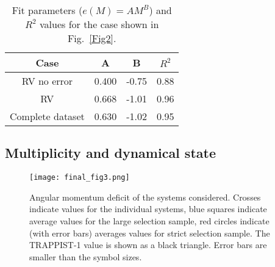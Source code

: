 \documentclass[letter]{aa} %
\begin{document}
        
        \begin{table}
                \caption{Fit parameters ($e(M)=AM^{B}$) and $R^{2}$ values for the case shown in Fig.~\ref{Fig2}.}             %
                \label{table:3}      %
                \centering                          %
                \begin{tabular}{c c c c}        %
                        \hline\hline                 %
                        Case & A & B & $R^{2}$ \\    %
                        \hline                        %
                        RV no error & 0.400 & -0.75 & 0.88\\      %
                        RV & 0.668 & -1.01  & 0.96\\
                        Complete dataset & 0.630 & -1.02 & 0.95\\
                        \hline                                   %
                \end{tabular}
        \end{table}
        
        \subsection{Multiplicity and dynamical state}
        

        
        \begin{figure}
                \centering
                \texttt{[image: final\_fig3.png]}
        \caption{Angular momentum deficit of the systems considered. Crosses indicate values for the individual systems, blue squares indicate average values for the large selection sample, red circles indicate (with error bars) averages values for strict selection sample. The TRAPPIST-1 value is shown as a black triangle. Error bars are smaller than the symbol sizes.
        }
        \label{Fig3}
        \end{figure}
        
\end{document}

